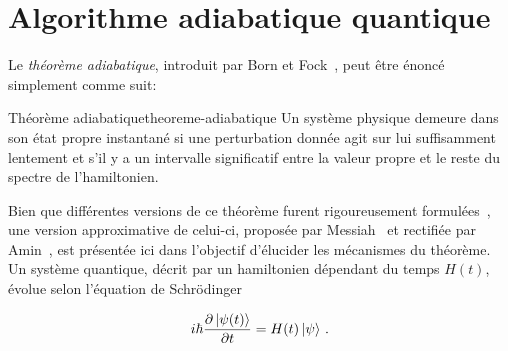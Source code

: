 

\section{Algorithme adiabatique quantique}
\label{sec:algorithme-adiabatique-quantique}

Le \textit{théorème adiabatique}, introduit par Born et Fock~\cite{bornBeweisAdiabatensatzes1928}, peut être énoncé simplement comme suit:

\begin{subtheorem}{Théorème adiabatique}{theoreme-adiabatique}
    Un système physique demeure dans son état propre instantané si une perturbation donnée agit sur lui suffisamment lentement et s'il y a un intervalle significatif entre la valeur propre et le reste du spectre de l'hamiltonien.
\end{subtheorem}

Bien que différentes versions de ce théorème furent rigoureusement formulées~\cite{albashAdiabaticQuantumComputation2018}, une version approximative de celui-ci, proposée par Messiah~\cite{messiahQuantumMechanics1961} et rectifiée par Amin~\cite{aminConsistencyAdiabaticTheorem2009}, est présentée ici dans l'objectif d'élucider les mécanismes du théorème. Un système quantique, décrit par un hamiltonien dépendant du temps $H(t)$, évolue selon l'équation de Schrödinger


\begin{align*}
   i \hbar \frac{\partial \ket{\psi(t)}}{\partial t} = H(t) \ket{\psi} \,.
\end{align*}

